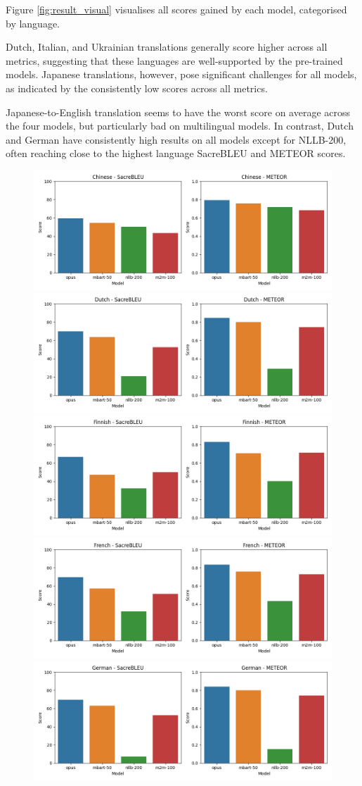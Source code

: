 \documentclass[a4paper, 11pt]{article}
\begin{document}
Figure \ref{fig:result_visual} visualises all scores gained by each model, categorised by language.

Dutch, Italian, and Ukrainian translations generally score higher across all metrics, suggesting that these languages are well-supported by the pre-trained models. Japanese translations, however, pose significant challenges for all models, as indicated by the consistently low scores across all metrics.

Japanese-to-English translation seems to have the worst score on average across the four models, but particularly bad on multilingual models. In contrast, Dutch and German have consistently high results on all models except for NLLB-200, often reaching close to the highest language SacreBLEU and METEOR scores.

\begin{figure}[htbp]
    \centering
    \includegraphics[width=0.49\linewidth]{figures/chinese_all_metrics.png}
    \includegraphics[width=0.49\linewidth]{figures/dutch_all_metrics.png}
    \includegraphics[width=0.49\linewidth]{figures/finnish_all_metrics.png}
    \includegraphics[width=0.49\linewidth]{figures/french_all_metrics.png}
    \includegraphics[width=0.49\linewidth]{figures/german_all_metrics.png}

\end{figure}
\end{document}

